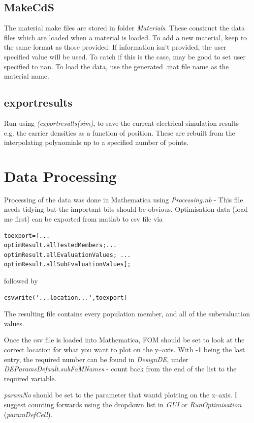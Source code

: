 \documentclass[]{article}  %
\begin{document}
\subsection{MakeCdS}
The material make files are stored in folder \emph{Materials}. These construct the data files which are loaded when a material is loaded. To add a new material, keep to the same format as those provided. If information isn't provided, the user specified value will be used. To catch if this is the case, may be good to set user specified to nan. To load the data, use the generated .mat file name as the material name.

\subsection{exportresults}
Run using \emph{(exportresults(sim)}, to save the current electrical simulation results -- e.g. the carrier densities as a function of position. These are rebuilt from the interpolating polynomials up to a specified number of points.

\section{Data Processing}
Processing of the data was done in Mathematica using \emph{Processing.nb} - This file needs tidying but the important bits should be obvious. Optimisation data (load me first) can be exported from matlab to csv file via 
\begin{verbatim}
toexport=[...
optimResult.allTestedMembers;...
optimResult.allEvaluationValues; ...
optimResult.allSubEvaluationValues];
\end{verbatim}
followed by 
\begin{verbatim}
csvwrite('...location...',toexport)
\end{verbatim}

The resulting file contains every population member, and all of the subevaluation values.

Once the csv file is loaded into Mathematica, FOM should be set to look at the correct location for what you want to plot on the y--axis. With -1 being the last entry, the required number can be found in \emph{DesignDE}, under \emph{DEParamsDefault.subFoMNames} - count back from the end of the list to the required variable.

\emph{paramNo} should be set to the parameter that wantd plotting on the x--axis. I suggest counting forwards using the dropdown list in \emph{GUI} or \emph{RunOptimisation} (\emph{paramDefCell}).
\end{document}
